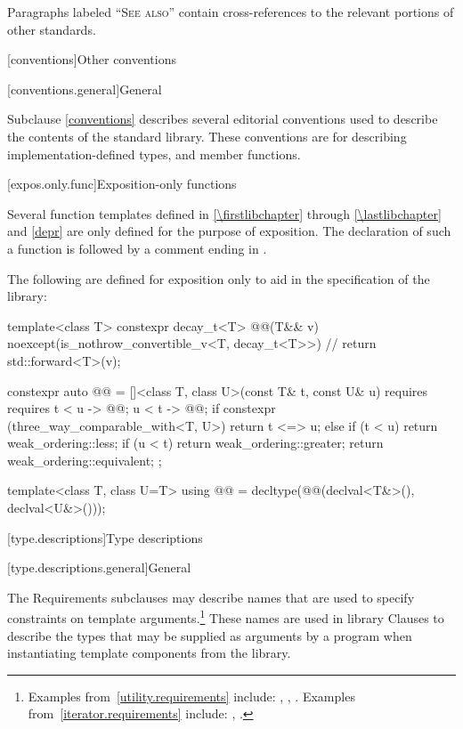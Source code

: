 \pnum
Paragraphs labeled ``\textsc{See also}'' contain cross-references to the relevant portions
of other standards.

[conventions]{Other conventions}

[conventions.general]{General}
%

\pnum
Subclause \ref{conventions} describes several editorial conventions used to describe the contents
of the \Cpp{} standard library.
These conventions are for describing
implementation-defined types,
and member functions.

[expos.only.func]{Exposition-only functions}

\pnum
Several function templates
defined in \ref{\firstlibchapter} through \ref{\lastlibchapter} and \ref{depr}
are only defined for the purpose of exposition.
The declaration of such a function is followed by a comment ending in \expos.

\pnum
The following are defined for exposition only
to aid in the specification of the library:
%
\begin{codeblock}
template<class T> constexpr decay_t<T> @@(T&& v)
    noexcept(is_nothrow_convertible_v<T, decay_t<T>>)           // \expos
  { return std::forward<T>(v); }

constexpr auto @@ =
  []<class T, class U>(const T& t, const U& u)
    requires requires {
      { t < u } -> @@;
      { u < t } -> @@;
    }
  {
    if constexpr (three_way_comparable_with<T, U>) {
      return t <=> u;
    } else {
      if (t < u) return weak_ordering::less;
      if (u < t) return weak_ordering::greater;
      return weak_ordering::equivalent;
    }
  };

template<class T, class U=T>
using @@ = decltype(@@(declval<T&>(), declval<U&>()));
\end{codeblock}

[type.descriptions]{Type descriptions}

[type.descriptions.general]{General}

\pnum
The Requirements subclauses may describe names that are used to specify
constraints on template arguments.\footnote{Examples
from~\ref{utility.requirements} include:
,
,
.
Examples from~\ref{iterator.requirements} include:
,
.}
These names are used in library Clauses
to describe the types that
may be supplied as arguments by a \Cpp{} program when instantiating template components from
the library.

